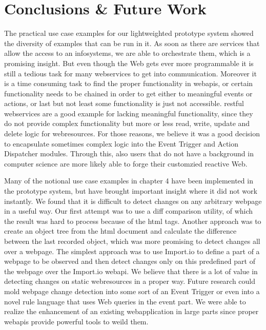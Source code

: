 
\chapter{Conclusions \& Future Work}

The practical use case examples for our lightweighted prototype system showed the diversity of examples that can be run in it.
As soon as there are services that allow the access to an \textrm{\glspl{infosystem}}, we are able to orchestrate them, which is a promising insight.
But even though the Web gets ever more programmable it is still a tedious task for many \textrm{\glspl{webservice}} to get into communication.
Moreover it is a time consuming task to find the proper functionality in \textrm{\glspl{webapi}}, or certain functionality needs to be chained in order to get either to meaningful events or actions, or last but not least some functionality is just not accessible.
\textrm{\acrshort{rest}}ful \textrm{\glspl{webservice}} are a good example for lacking meaningful functionality, since they do not provide complex functionality but more or less read, write, update and delete logic for \textrm{\glspl{webresource}}.
For those reasons, we believe it was a good decision to encapsulate sometimes complex logic into the \textrm{Event Trigger} and \textrm{Action Dispatcher} modules.
Through this, also users that do not have a background in computer science are more likely able to forge their customzied reactive Web.


Many of the notional use case examples in chapter 4 have been implemented in the prototype system, but have brought important insight where it did not work instantly.
We found that it is difficult to detect changes on any arbitrary webpage in a useful way.
Our first attempt was to use a diff comparison utility, of which the result was hard to process because of the \textrm{\acrshort{html}} tags.
Another approach was to create an object tree from the \textrm{\acrshort{html}} document and calculate the difference between the last recorded object, which was more promising to detect changes all over a webpage.
The simplest approach was to use \textrm{Import.io} to define a part of a webpage to be observed and then detect changes only on this predefined part of the webpage over the \textrm{Import.io} \textrm{\gls{webapi}}.
We believe that there is a lot of value in detecting changes on static \textrm{\glspl{webresource}} in a proper way.
Future research could mold webpage change detection into some sort of an \textrm{Event Trigger} or even into a novel rule language that uses Web queries in the event part.
We were able to realize the enhancement of an existing \textrm{\gls{webapplication}} in large parts since proper \textrm{\glspl{webapi}} provide powerful tools to weild them.

